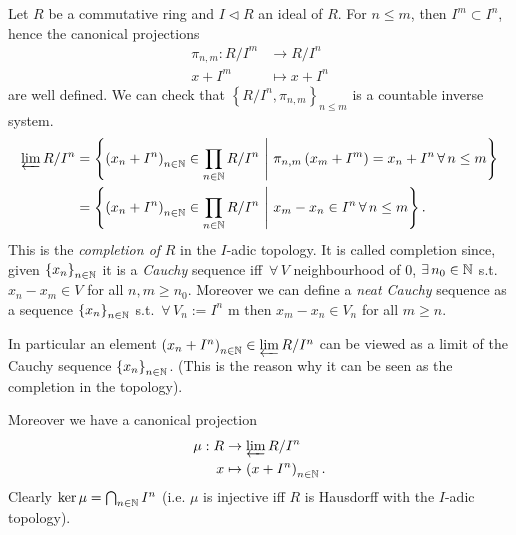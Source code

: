 \begin{ex}
	Let $R$ be a commutative ring and $I \triangleleft R$ an ideal of $R$.
	For $n \leq m$, then $I^m \subset I^n$, hence the canonical projections
	\begin{align}
		\pi_{n,m}: R/I^m &\to R/I^n \\
		x + I^m &\mapsto x + I^n
	\end{align} 
	are well defined.
	We can check that $\left\{ R/I^n, \pi_{n,m} \right\}_{n \leq m}$ is a countable inverse system.
	\begin{align}
		\varprojlim R/I^n &=
		\left\{ \left( x_n + I^n \right)_{n \in \N} \in \prod_{n \in \N} R/I^n \ \middle|\ 
		\pi_{n,m}\left( x_m + I^m \right) = x_n + I^n \,\forall\, n \leq m \right\}\\
				  &=
		\left\{ \left( x_n + I^n \right)_{n \in \N} \in \prod_{n \in \N} R/I^n \ \middle|\ 
		x_m - x_n \in I^n \,\forall\, n \leq m \right\}
	.\end{align} 
	This is the {\em completion of} $R$ in the $I$-adic topology.
	It is called completion since, given $\left\{ x_n \right\}_{n \in \mathbb{N}}$ it is a {\em Cauchy} sequence iff
	$\,\forall\, V$ neighbourhood of $0$, $\exists\, n_0 \in \mathbb{N}$ s.t. $x_n - x_m \in V$ for all $n,m \geq n_0$.
	Moreover we can define a {\em neat Cauchy} sequence as a sequence $\left\{ x_n \right\}_{n \in \mathbb{N}}$ s.t.
	$\,\forall\, V_n := I^n$ m then $x_m - x_n \in V_n$ for all $m \geq n$.

	In particular an element $\left( x_n + I^n \right)_{n \in \mathbb{N}} \in \varprojlim R/I^n$ can be viewed as a limit
	of the Cauchy sequence $\left\{ x_n \right\}_{n \in \mathbb{N}}$.
	(This is the reason why it can be seen as the completion in the topology).

	Moreover we have a canonical projection
	\begin{align}
		\mu: R &\to \varprojlim R/I^n \\
		x &\mapsto \left( x + I^n \right)_{n \in \mathbb{N}}
	.\end{align} 
	Clearly $\ker \mu = \bigcap_{n \in \mathbb{N}} I^n$ (i.e. $\mu$ is injective iff
	$R$ is Hausdorff with the $I$-adic topology).
\end{ex} 

